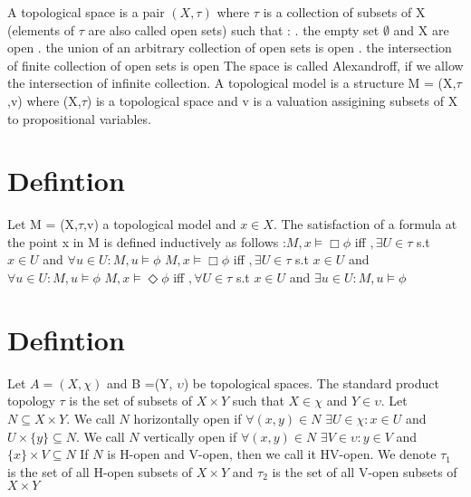 \documentclass[12pt, a4paper]{scrreprt}
\begin{document}
A topological space is a pair $(X, \tau)$ where $\tau$ is a collection of subsets of X (elements of $\tau$ are also called open sets) such that : 
\newline
{}. the empty set $\emptyset $ and X are open
. the union of an arbitrary collection of open sets is open
. the intersection of finite collection of open sets is open
\newline
\newline
The space is called Alexandroff, if we allow the intersection of infinite collection.
A topological model is a structure M = (X,$\tau$,v) where (X,$\tau$) is a topological space
and v is a valuation assigining subsets of X to propositional variables. 

\section{Defintion}
Let M = (X,$\tau$,v) a topological model and $x \in X$. The satisfaction of a formula
at the point x in M is defined inductively as follows :$M,x \models \Box \phi$ iff $,\exists U \in \tau$ s.t $x \in U$ and $\forall u \in U : M,u \models \phi$
\newline
$M,x \models \Box \phi$ iff $,\exists U \in \tau$ s.t $x \in U$ and $\forall u \in U : M,u \models \phi$
\newline
$M,x \models \Diamond \phi$ iff $,\forall U \in \tau$ s.t $x \in U$ and $\exists u \in U : M,u \models \phi$

\section{Defintion}
Let $A = (X, \chi)$ and B =(Y, $\upsilon$) be topological spaces. The standard product topology $\tau$ is the set of subsets of 
$X \times Y$ such that $X \in \chi$ and $Y \in \upsilon$. \newline
Let $N \subseteq X \times Y $. We call $N$ horizontally open if $\forall (x,y) \in N $ $\exists U \in \chi : x \in U $ and $ U \times \{ y \} \subseteq N$. \newline We call $N$ 
vertically open if $\forall (x,y) \in N$ $\exists V \in \upsilon : y \in V$ and  $ \{ x \} \times V \subseteq N$ \newline
If $N$ is H-open and V-open, then we call it HV-open. \newline
We denote $\tau_1$ is the set of all H-open subsets of $X \times Y$ and $\tau_2$ is the set of all V-open subsets of $X\times Y$
\end{document}
